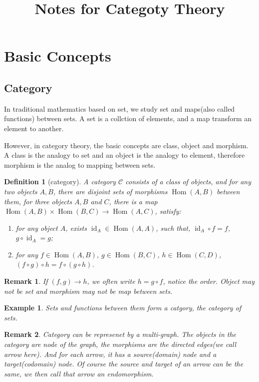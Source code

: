 \documentclass{article}
\title{Notes for Categoty Theory}
\newtheorem*{define}{Definition}
\newtheorem*{eg}{Example}
\newtheorem*{rem}{Remark}
\newcommand{\Hom}{\mathop{\mathrm{Hom}}}
\newcommand{\id}{\mathop{\mathrm{id}}}
\begin{document}
\maketitle

\section{Basic Concepts}
\subsection{Category}
In traditional mathematics based on set,
we study set and maps(also called functions) between sets.
A set is a collction of elements, and a map transform an element to another.

However, in category theory, the basic concepts are class, object and morphism.
A class is the analogy to set and an object is the analogy to element,
therefore morphism is the analog to mapping between sets.

\begin{define}[category]
A category $\mathcal{C}$ consists of a class of objects, and for any
two objects $A, B$, there are disjoint sets of morphisms
$\Hom(A, B)$ between them, for three objects $A, B$ and $C$,
there is a map $\Hom(A, B) \times \Hom(B, C) \to \Hom(A, C)$,
satisfy:
\begin{enumerate}[1).~]
\item for any object $A$, exists $\id_{A} \in \Hom(A, A)$,
such that, $\id_{A} \circ f = f$, $g \circ \id_{A} = g$;
\item for any $f \in \Hom(A, B)$, $g \in \Hom(B, C)$,
$h \in \Hom(C, D)$, $(f \circ g) \circ h = f \circ (g \circ h)$.
\end{enumerate}
\end{define}

\begin{rem}
If $(f,g) \to h$, we often write $h = g \circ f$, notice the
order. Object may not be set and morphism may not be map
between sets.
\end{rem}

\begin{eg}
Sets and functions between them form a catgory, the category
of sets.
\end{eg}

\begin{rem}
Category can be represenet by a multi-graph. The objects in
the category are node of the graph, the morphisms are the
directed edges(we call arrow here). And for each arrow, it
has a source(domain) node and a target(codomain) node.
Of course the source and target of an arrow can be the same,
we then call that arrow an endomorphism.
\end{rem}
\end{document}
